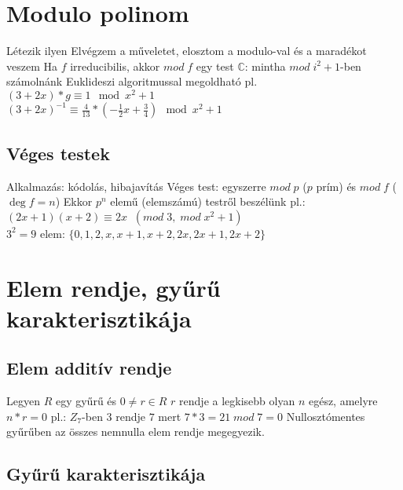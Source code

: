 \documentclass[12pt,a4paper]{article}
\begin{document}
\pagebreak

\section{Modulo polinom}

\begin{outline}
	\1 Létezik ilyen
	\1 Elvégzem a műveletet, elosztom a modulo-val és a maradékot veszem
	\1 Ha $f$ irreducibilis, akkor $mod \; f$ egy test
	\1 $\mathbb{C}$: mintha $mod \; i^2+1$-ben számolnánk
	\1 Euklideszi algoritmussal megoldható pl. $(3+2x)*g \equiv 1 \mod x^2+1$\\
	$(3+2x)^{-1} \equiv \frac{4}{13} * (-\frac{1}{2}x + \frac{3}{4}) \mod x^2+1$
\end{outline}

\subsection{Véges testek}

\begin{outline}
	\1 Alkalmazás: kódolás, hibajavítás
	\1 Véges test: egyszerre $mod\;p$ ($p$ prím) és $mod\;f$ ($\deg f = n$)
	\1 Ekkor $p^n$ elemű (elemszámú) testről beszélünk
	\1 pl.: $(2x+1)(x+2) \equiv 2x \;\; (mod \; 3, \; mod \; x^2+1)$\\
		$3^2=9$ elem: $\{0,1,2,x,x+1,x+2,2x,2x+1,2x+2\}$
\end{outline}

\section{Elem rendje, gyűrű karakterisztikája}

\subsection{Elem additív rendje}

\begin{outline}
	\1 Legyen $R$ egy gyűrű és $0 \ne r \in R$
	\1 $r$ rendje a legkisebb olyan $n$ egész, amelyre $n*r=0$
	\1 pl.: $Z_7$-ben $3$ rendje $7$ mert $7*3=21 \; mod \; 7 = 0$
	\1 Nullosztómentes gyűrűben az összes nemnulla elem rendje megegyezik.
\end{outline}

\subsection{Gyűrű karakterisztikája}
\end{document}
